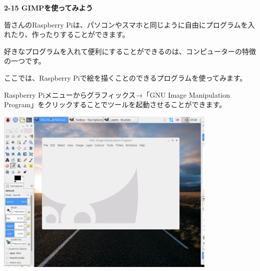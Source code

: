 \documentclass[a4paper,dvipdfmx]{jarticle}
\begin{document}
{\bfseries
2-15 GIMPを使ってみよう}


\bigskip

皆さんのRaspberry
Piは、パソコンやスマホと同じように自由にプログラムを入れたり、作ったりすることができます。

好きなプログラムを入れて便利にすることができるのは、コンピューターの特徴の一つです。

ここでは、Raspberry
Piで絵を描くことのできるプログラムを使ってみます。

Raspberry Piメニューからグラフィックス→「GNU Image
Manipulation
Program」をクリックすることでツールを起動させることができます。


\bigskip



\begin{center}
\includegraphics[width=10.583cm,height=7.938cm]{text02-img/text02-img037.png}

\end{center}

\bigskip


\bigskip


\bigskip


\bigskip


\bigskip


\bigskip


\bigskip


\bigskip


\bigskip


\bigskip


\bigskip


\bigskip


\bigskip


\bigskip


\bigskip
\end{document}
